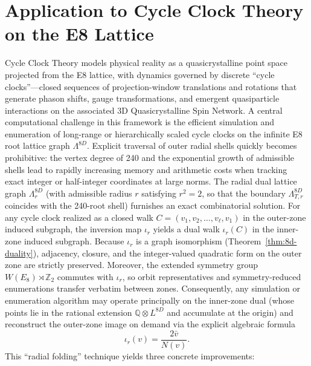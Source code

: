 \documentclass{article}
\begin{document}
\section{Application to Cycle Clock Theory on the E8 Lattice}
Cycle Clock Theory models physical reality as a quasicrystalline point space projected from the E8 lattice, with dynamics governed by discrete ``cycle clocks''---closed sequences of projection-window translations and rotations that generate phason shifts, gauge transformations, and emergent quasiparticle interactions on the associated 3D Quasicrystalline Spin Network.
A central computational challenge in this framework is the efficient simulation and enumeration of long-range or hierarchically scaled cycle clocks on the infinite E8 root lattice graph \(\Lambda^{8D}\). Explicit traversal of outer radial shells quickly becomes prohibitive: the vertex degree of 240 and the exponential growth of admissible shells lead to rapidly increasing memory and arithmetic costs when tracking exact integer or half-integer coordinates at large norms.
The radial dual lattice graph \(\Lambda_r^{8D}\) (with admissible radius \(r\) satisfying \(r^2 = 2\), so that the boundary \(\Lambda_{T,r}^{8D}\) coincides with the 240-root shell) furnishes an exact combinatorial solution. For any cycle clock realized as a closed walk \(C = (v_1, v_2, \dots, v_\ell, v_1)\) in the outer-zone induced subgraph, the inversion map \(\iota_r\) yields a dual walk \(\iota_r(C)\) in the inner-zone induced subgraph. Because \(\iota_r\) is a graph isomorphism (Theorem~\ref{thm:8d-duality}), adjacency, closure, and the integer-valued quadratic form on the outer zone are strictly preserved. Moreover, the extended symmetry group \(W(E_8) \rtimes \mathbb{Z}_2\) commutes with \(\iota_r\), so orbit representatives and symmetry-reduced enumerations transfer verbatim between zones.
Consequently, any simulation or enumeration algorithm may operate principally on the inner-zone dual (whose points lie in the rational extension \(\mathbb{Q} \otimes L^{8D}\) and accumulate at the origin) and reconstruct the outer-zone image on demand via the explicit algebraic formula
\[
\iota_r(v) = \frac{2 \bar{v}}{N(v)}.
\]
This ``radial folding'' technique yields three concrete improvements:
\end{document}
